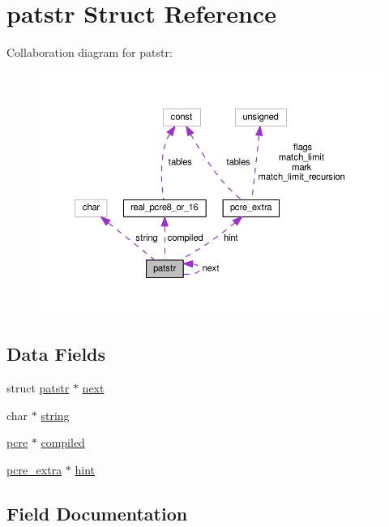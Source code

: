 \hypertarget{structpatstr}{}\section{patstr Struct Reference}
\label{structpatstr}


Collaboration diagram for patstr\+:
\nopagebreak
\begin{figure}[H]
\begin{center}
\leavevmode
\includegraphics[width=350pt]{structpatstr__coll__graph}
\end{center}
\end{figure}
\subsection*{Data Fields}
\begin{DoxyCompactItemize}
\item 
struct \hyperlink{structpatstr}{patstr} $\ast$ \hyperlink{structpatstr_afa4a52cc40795b8fa39d81378aad1269}{next}
\item 
char $\ast$ \hyperlink{structpatstr_a9774093b992baa8bf55c39fd2aecb95d}{string}
\item 
\hyperlink{pcre_8h_a2bc1b88cfd3d453b96bdc5411a22484f}{pcre} $\ast$ \hyperlink{structpatstr_ad1e85c1c7136d7fac5f9ffd16367181a}{compiled}
\item 
\hyperlink{structpcre__extra}{pcre\+\_\+extra} $\ast$ \hyperlink{structpatstr_abd8c131927550a90cb7e51bd4159e3c6}{hint}
\end{DoxyCompactItemize}


\subsection{Field Documentation}
